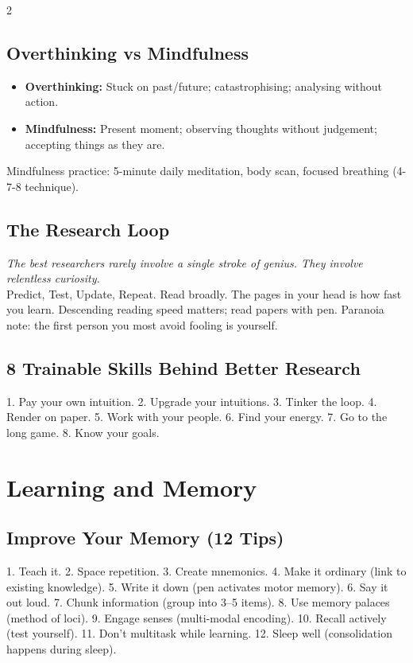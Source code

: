\documentclass[10pt,a4paper]{article}
\begin{document}
\begin{multicols}{2}
\subsection{Overthinking vs Mindfulness}
\begin{itemize}
\item \textbf{Overthinking:} Stuck on past/future; catastrophising; analysing without action.
\item \textbf{Mindfulness:} Present moment; observing thoughts without judgement; accepting things as they are.
\end{itemize}
Mindfulness practice: 5-minute daily meditation, body scan, focused breathing (4-7-8 technique).

\subsection{The Research Loop}
\textit{The best researchers rarely involve a single stroke of genius. They involve relentless curiosity.}\\
Predict, Test, Update, Repeat. Read broadly. The pages in your head is how fast you learn. Descending reading speed matters; read papers with pen. Paranoia note: the first person you most avoid fooling is yourself.

\subsection{8 Trainable Skills Behind Better Research}
1. Pay your own intuition. 2. Upgrade your intuitions. 3. Tinker the loop. 4. Render on paper. 5. Work with your people. 6. Find your energy. 7. Go to the long game. 8. Know your goals.

\section{Learning and Memory}

\subsection{Improve Your Memory (12 Tips)}
1. Teach it. 2. Space repetition. 3. Create mnemonics. 4. Make it ordinary (link to existing knowledge). 5. Write it down (pen activates motor memory). 6. Say it out loud. 7. Chunk information (group into 3--5 items). 8. Use memory palaces (method of loci). 9. Engage senses (multi-modal encoding). 10. Recall actively (test yourself). 11. Don't multitask while learning. 12. Sleep well (consolidation happens during sleep).


\end{multicols}
\end{document}
